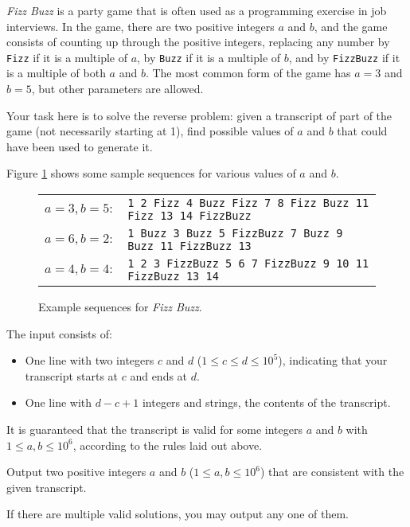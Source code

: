 
\newcommand{\maxd}{10^5}

%
\emph{Fizz Buzz} is a party game that is often used as a programming exercise in job interviews.
In the game, there are two positive integers $a$ and $b$, and the game consists of counting up through the positive integers, replacing any number by \texttt{Fizz} if it is a multiple of $a$, by \texttt{Buzz} if it is a multiple of $b$, and by \texttt{FizzBuzz} if it is a multiple of both $a$ and $b$.
The most common form of the game has $a=3$ and $b=5$, but other parameters are allowed.

Your task here is to solve the reverse problem: given a transcript of part of the game (not necessarily starting at 1), find possible values of $a$ and $b$ that could have been used to generate it.

Figure \ref{fig:i} shows some sample sequences for various values of $a$ and $b$.

\begin{figure}[!h]
  \centering
  \begin{tabular}{ll}
  \hspace{-0.6em}
    $a=3, b=5:$ & \small\texttt{1 2 Fizz 4 Buzz Fizz 7 8 Fizz Buzz 11 Fizz 13 14 FizzBuzz} \\
  \hspace{-0.6em}
    $a=6, b=2:$ & \small\texttt{1 Buzz 3 Buzz 5 FizzBuzz 7 Buzz 9 Buzz 11 FizzBuzz 13} \\
  \hspace{-0.6em}
    $a=4, b=4:$ & \small\texttt{1 2 3 FizzBuzz 5 6 7 FizzBuzz 9 10 11 FizzBuzz 13 14} \\
  \end{tabular}
  \caption{Example sequences for \emph{Fizz Buzz}.}
  \label{fig:i}
\end{figure}
\vspace{-1em}
\begin{Input}
  The input consists of:
  \begin{itemize}
    \item One line with two integers $c$ and $d$ ($1 \le c \le d \le \maxd$), indicating that your transcript starts at $c$ and ends at $d$.
    \item One line with $d-c+1$ integers and strings, the contents of the transcript.
  \end{itemize}
  It is guaranteed that the transcript is valid for some integers $a$ and $b$ with $1 \le a,b \le 10^6$, according to the rules laid out above.
\end{Input}

\begin{Output}
  Output two positive integers $a$ and $b$ ($1 \le a,b \le 10^6$) that are consistent with the given transcript.

  If there are multiple valid solutions, you may output any one of them.
\end{Output}

